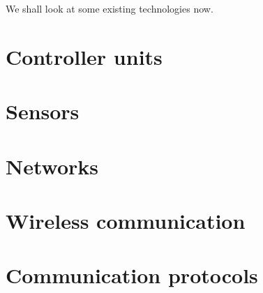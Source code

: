 We shall look at some existing technologies now.

\section{Controller units}


\section{Sensors}

\section{Networks}


\section{Wireless communication}

\section{Communication protocols}
